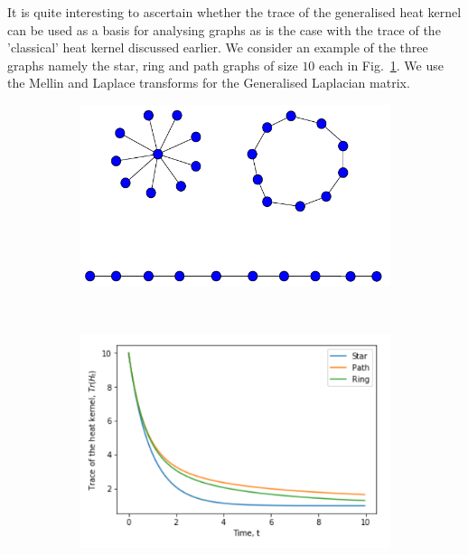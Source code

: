 \documentclass[10pt,a4paper]{article}
\theoremstyle{plain}
\theoremstyle{definition}
\begin{document}
        It is quite interesting to ascertain whether the trace of the generalised heat kernel can be used as a basis for analysing graphs as is the case with the trace of the 'classical' heat kernel discussed earlier.
        We consider an example of the three graphs namely the star, ring and path graphs of size $10$ each in Fig.~\ref{kernelgraphs}. We use the Mellin and Laplace transforms for the Generalised Laplacian matrix.
        \begin{figure}[H]
        	\centering
        	\begin{subfigure}[b]{0.45\textwidth}
        		\includegraphics[width= \textwidth]{images/kernel-graphs.pdf}
        		\caption{}
        		\label{kernelgraphs}
        	\end{subfigure}~
        	\begin{subfigure}[b]{0.45\textwidth}
        		\includegraphics[width= \textwidth]{images/Trace-kernel-plot}
        		\caption{}
        		\label{plot-kernel}

\end{subfigure}
\end{figure}
\end{document}
